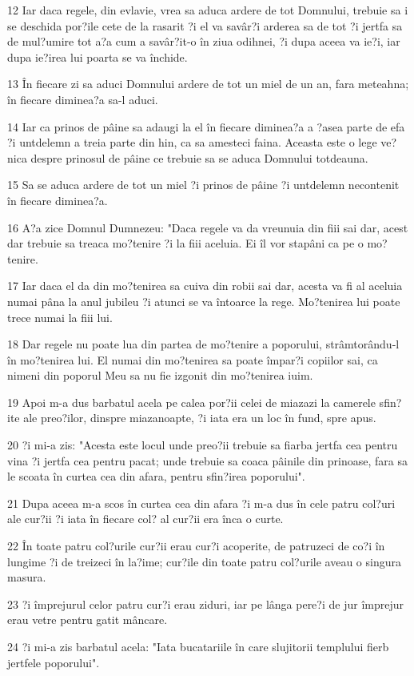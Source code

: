 \par 12 Iar daca regele, din evlavie, vrea sa aduca ardere de tot Domnului, trebuie sa i se deschida por?ile cete de la rasarit ?i el va savâr?i arderea sa de tot ?i jertfa sa de mul?umire tot a?a cum a savâr?it-o în ziua odihnei, ?i dupa aceea va ie?i, iar dupa ie?irea lui poarta se va închide.
\par 13 În fiecare zi sa aduci Domnului ardere de tot un miel de un an, fara meteahna; în fiecare diminea?a sa-l aduci.
\par 14 Iar ca prinos de pâine sa adaugi la el în fiecare diminea?a a ?asea parte de efa ?i untdelemn a treia parte din hin, ca sa amesteci faina. Aceasta este o lege ve?nica despre prinosul de pâine ce trebuie sa se aduca Domnului totdeauna.
\par 15 Sa se aduca ardere de tot un miel ?i prinos de pâine ?i untdelemn necontenit în fiecare diminea?a.
\par 16 A?a zice Domnul Dumnezeu: "Daca regele va da vreunuia din fiii sai dar, acest dar trebuie sa treaca mo?tenire ?i la fiii aceluia. Ei îl vor stapâni ca pe o mo?tenire.
\par 17 Iar daca el da din mo?tenirea sa cuiva din robii sai dar, acesta va fi al aceluia numai pâna la anul jubileu ?i atunci se va întoarce la rege. Mo?tenirea lui poate trece numai la fiii lui.
\par 18 Dar regele nu poate lua din partea de mo?tenire a poporului, strâmtorându-l în mo?tenirea lui. El numai din mo?tenirea sa poate împar?i copiilor sai, ca nimeni din poporul Meu sa nu fie izgonit din mo?tenirea iuim.
\par 19 Apoi m-a dus barbatul acela pe calea por?ii celei de miazazi la camerele sfin?ite ale preo?ilor, dinspre miazanoapte, ?i iata era un loc în fund, spre apus.
\par 20 ?i mi-a zis: "Acesta este locul unde preo?ii trebuie sa fiarba jertfa cea pentru vina ?i jertfa cea pentru pacat; unde trebuie sa coaca pâinile din prinoase, fara sa le scoata în curtea cea din afara, pentru sfin?irea poporului".
\par 21 Dupa aceea m-a scos în curtea cea din afara ?i m-a dus în cele patru col?uri ale cur?ii ?i iata în fiecare col? al cur?ii era înca o curte.
\par 22 În toate patru col?urile cur?ii erau cur?i acoperite, de patruzeci de co?i în lungime ?i de treizeci în la?ime; cur?ile din toate patru col?urile aveau o singura masura.
\par 23 ?i împrejurul celor patru cur?i erau ziduri, iar pe lânga pere?i de jur împrejur erau vetre pentru gatit mâncare.
\par 24 ?i mi-a zis barbatul acela: "Iata bucatariile în care slujitorii templului fierb jertfele poporului".

